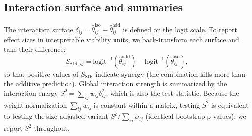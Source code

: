 \documentclass[unnumsec,webpdf,contemporary,large]{oup-authoring-template}
\begin{document}
\subsection{Interaction surface and summaries}
The interaction surface $\delta_{ij}=\hat\theta^{\mathrm{iso}}_{ij}-\hat\theta^{\mathrm{add}}_{ij}$ is defined on the logit scale.
To report effect sizes in interpretable viability units, we back-transform each surface and take their difference:
\begin{equation}
S_{\mathrm{SIR},ij}=\mathrm{logit}^{-1}(\hat\theta^{\mathrm{add}}_{ij})-\mathrm{logit}^{-1}(\hat\theta^{\mathrm{iso}}_{ij}),
\end{equation}
so that positive values of $S_{\mathrm{SIR}}$ indicate synergy (the combination kills more than the additive prediction).
Global interaction strength is summarized by the interaction energy $S^2=\sum_{ij} w_{ij}\delta_{ij}^2$, which is also the test statistic.
Because the weight normalization $\sum_{ij} w_{ij}$ is constant within a matrix, testing $S^2$ is equivalent to testing the size-adjusted variant $S^2/\sum_{ij} w_{ij}$ (identical bootstrap p-values); we report $S^2$ throughout.
\end{document}
